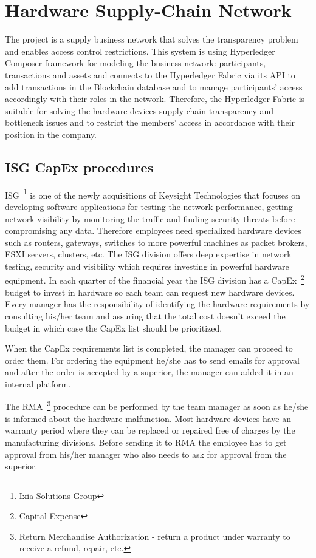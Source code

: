 \chapter{Hardware Supply-Chain Network}
\label{chapter:chapter4}
The \textbf{\emph{\project}} project is a supply business network that solves the transparency problem and enables access control restrictions.
This system is using Hyperledger Composer framework for modeling the business network: participants, transactions and assets and connects to the Hyperledger Fabric via its API to add transactions in the Blockchain database and to manage participants' access accordingly with their roles in the network.
Therefore, the Hyperledger Fabric is suitable for solving the hardware devices supply chain transparency and bottleneck issues and to restrict the members' access in accordance with their position in the company.


\section{ISG CapEx procedures}
\label{sec:chapter4-section1}

ISG~\footnote{Ixia Solutions Group} is one of the newly acquisitions of Keysight Technologies that focuses on developing software applications for testing the network performance, getting network visibility by monitoring the traffic and finding security threats before compromising any data.
Therefore employees need specialized hardware devices such as routers, gateways, switches to more powerful machines as packet brokers, ESXI servers, clusters, etc.
The ISG division offers deep expertise in network testing, security and visibility which requires investing in powerful hardware equipment.
In each quarter of the financial year the ISG division has a CapEx~\footnote{Capital Expense} budget to invest in hardware so each team can request new hardware devices.
Every manager has the responsibility of identifying the hardware requirements by consulting his/her team and assuring that the total cost doesn't exceed the budget in which case the CapEx list should be prioritized.

When the CapEx requirements list is completed, the manager can proceed to order them.
For ordering the equipment he/she has to send emails for approval and after the order is accepted by a superior, the manager can added it in an internal platform.

The RMA~\footnote{Return Merchandise Authorization - return a product under warranty to receive a refund, repair, etc.} procedure can be performed by the team manager as soon as he/she is informed about the hardware malfunction. Most hardware devices have an warranty period where they can be replaced or repaired free of charges by the manufacturing divisions. Before sending it to RMA the employee has to get approval from his/her manager who also needs to ask for approval from the superior.

